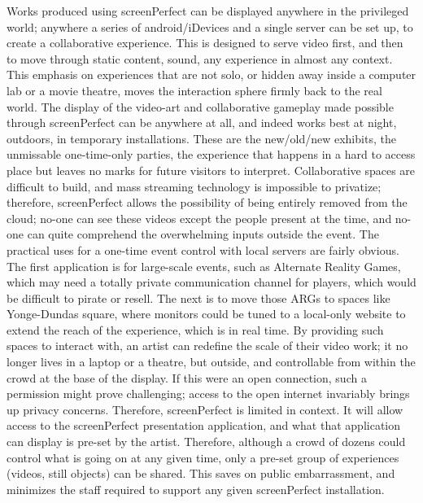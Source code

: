 Works produced using screenPerfect can be displayed anywhere in the privileged world; anywhere a series of android/iDevices and a single server can be set up, to create a collaborative experience. This is designed to serve video first, and then to move through static content, sound, any experience in almost any context.
This emphasis on experiences that are not solo, or hidden away inside a computer lab or a movie theatre, moves the interaction sphere firmly back to the real world. The display of the video-art and collaborative gameplay made possible through screenPerfect can be anywhere at all, and indeed works best at night, outdoors, in temporary installations. These are the new/old/new exhibits, the unmissable one-time-only parties, the experience that happens in a hard to access place but leaves no marks for future visitors to interpret. Collaborative spaces are difficult to build, and mass streaming technology is impossible to privatize; therefore, screenPerfect allows the possibility of being entirely removed from the cloud; no-one can see these videos except the people present at the time, and no-one can quite comprehend the overwhelming inputs outside the event. 
The practical uses for a one-time event control with local servers are fairly obvious. The first application is for large-scale events, such as Alternate Reality Games, which may need a totally private communication channel for players, which would be difficult to pirate or resell. The next is to move those ARGs to spaces like Yonge-Dundas square, where monitors could be tuned to a local-only website to extend the reach of the experience, which is in real time. By providing such spaces to interact with, an artist can redefine the scale of their video work; it no longer lives in a laptop or a theatre, but outside, and controllable from within the crowd at the base of the display.
If this were an open connection, such a permission might prove challenging; access to the open internet invariably brings up privacy concerns. Therefore, screenPerfect is limited in context. It will allow access to the screenPerfect presentation application, and what that application can display is pre-set by the artist. Therefore, although a crowd of dozens could control what is going on at any given time, only a pre-set group of experiences (videos, still objects) can be shared. This saves on public embarrassment, and minimizes the staff required to support any given screenPerfect installation. 
